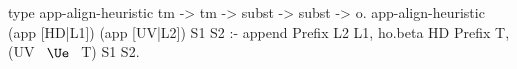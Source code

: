 \begin{elpicode}
  type app-align-heuristic tm -> tm -> subst -> subst -> o.
  app-align-heuristic (app [HD|L1]) (app [UV|L2]) S1 S2 :-
    append Prefix L2 L1,
    ho.beta HD Prefix T,
    (UV ~$\Ue$~ T) S1 S2.
\end{elpicode}
